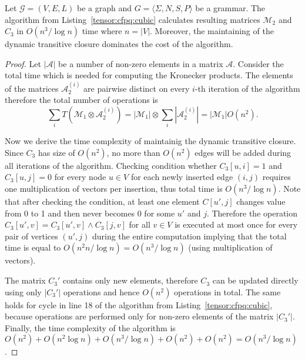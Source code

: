 \begin{theorem}{}
\label{theorem: subcubic}
    Let $\mathcal{G} = (V,E,L)$ be a graph and $G = \langle\Sigma, N, S, P\rangle$ be a grammar.
    The algorithm from Listing~\ref{tensor:cfpq:cubic} calculates resulting matrices $\mathcal{M}_2$ and $C_3$ in $O(n^3/\log n)$ time where $n = |V|$. Moreover, the maintaining of the dynamic transitive closure dominates the cost of the algorithm.
\end{theorem}

\begin{proof}
 Let $|\mathcal{A}|$ be a number of non-zero elements in a matrix $\mathcal{A}$. Consider the total time which is needed for computing the Kronecker products. The elements of the matrices $\mathcal{A}_2^{(i)}$ are pairwise distinct on every $i$-th iteration of the algorithm therefore the total number of operations is
 $$\sum\limits_i{T(\mathcal{M}_1 \otimes \mathcal{A}_2^{(i)})} = |\mathcal{M}_1| \otimes \sum\limits_i {|\mathcal{A}_2^{(i)}|} = |\mathcal{M}_1|O(n^2).$$


Now we derive the time complexity of maintainig the dynamic transitive closure.
Since $C_3$ has size of $O(n^2)$, no more than $O(n^2)$ edges will be added during all iterations of the algorithm.
Checking condition whether $C_3[u, i] = 1$ and $C_3[u, j]=0$ for every node $u \in V$ for each newly inserted edge $(i, j)$ requires one multiplication of vectors per insertion, thus total time is $O(n^3/\log n)$.
Note that after checking the condition, at least one element $C[u', j]$ changes value from 0 to 1 and then never becomes 0 for some $u'$ and $j$.
Therefore the operation $C_3[u',v] = C_3[u', v] \wedge C_3[j, v]$ for all $v \in V$ is executed at most once for every pair of vertices $(u',j)$ during the entire computation implying that the total time is equal to $O(n^2n/\log n)=O(n^3/\log n)$ (using multiplication of vectors).


The matrix $C_3'$ contains only new elements, therefore $C_3$ can be updated directly using only $|C_3'|$ operations and hence $O(n^2)$ operations in total.
The same holds for cycle in line 18 of the algorithm from Listing~\ref{tensor:cfpq:cubic}, because operations are performed only for non-zero elements of the matrix $|C_3'|$.
Finally, the time complexity of the algorithm is $O(n^2) + O(n^2 \log n) + O(n^3/\log n) + O(n^2) + O(n^2) = O(n^3/\log n)$.
\end{proof}{}

